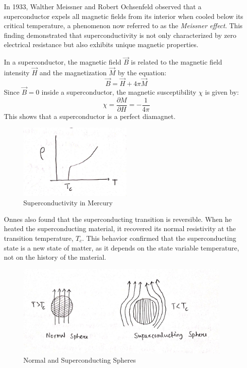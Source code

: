 \documentclass{article}
\begin{document}
In 1933, Walther Meissner and Robert Ochsenfeld observed that a superconductor expels all magnetic fields from its interior when cooled below its critical temperature, a phenomenon now referred to as the \emph{Meissner effect}. This finding demonstrated that superconductivity is not only characterized by zero electrical resistance but also exhibits unique magnetic properties.

In a superconductor, the magnetic field \(\vec{B}\) is related to the magnetic field intensity \(\vec{H}\) and the magnetization \(\vec{M}\) by the equation:
\[
\vec{B} = \vec{H} + 4\pi \vec{M}
\]
Since \(\vec{B} = 0\) inside a superconductor, the magnetic susceptibility \(\chi\) is given by:
\[
\chi = \frac{\partial M}{\partial H} = -\frac{1}{4\pi}
\]
This shows that a superconductor is a perfect diamagnet.

\begin{figure}
    \begin{center}
        \includegraphics[width=0.5\textwidth]{figures/1.png}
    \end{center}
    \caption{Superconductivity in Mercury}\label{fig:}
\end{figure}


Onnes also found that the superconducting transition is reversible. When he heated the superconducting material, it recovered its normal resistivity at the transition temperature, \(T_c\). This behavior confirmed that the superconducting state is a new state of matter, as it depends on the state variable temperature, not on the history of the material.

\begin{figure}
    \begin{center}
        \includegraphics[width=0.95\textwidth]{figures/2.png}
    \end{center}
    \caption{Normal and Superconducting Spheres}\label{fig:}
\end{figure}
\end{document}
